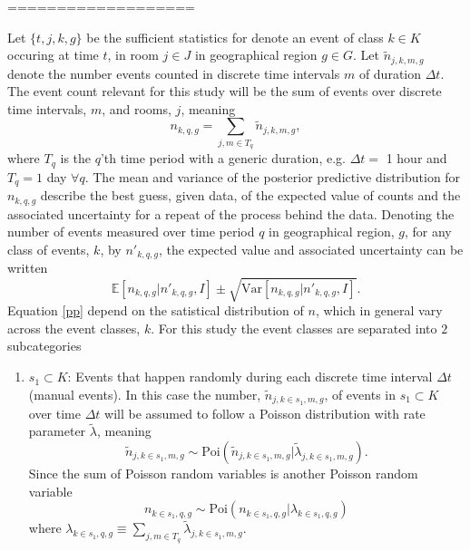 ===================


\begin{example}
	Let $\{t,j,k,g\}$ be the sufficient statistics for denote an event of class $k\in K$ occuring at time $t$, in room $j\in J$ in geographical region $g\in G$. Let $\tilde{n}_{j,k,m,g}$ denote the number events counted in discrete time intervals $m$ of duration $\Delta t$. The event count relevant for this study will be the sum of events over discrete time intervals, $m$, and rooms, $j$, meaning 
	\begin{equation}
		n_{k,q,g} = \sum_{j,m\in T_q}\tilde{n}_{j,k,m,g},
	\end{equation} 
	where $T_q$ is the $q$'th time period with a generic duration, e.g. $\Delta t=$ 1 hour and $T_q=1$ day $\forall q$. The mean and variance of the posterior predictive distribution for $n_{k,q,g}$ describe the best guess, given data, of the expected value of counts and the associated uncertainty for a repeat of the process behind the data. Denoting the number of events measured over time period $q$ in geographical region, $g$, for any class of events, $k$, by $n'_{k,q,g}$, the expected value and associated uncertainty can be written~\citep{Sivia2006,murphy2013}
	\begin{equation}
		\mathbb{E}[n_{k,q,g}|n'_{k,q,g},I]\pm \sqrt{\text{Var}[n_{k,q,g}|n'_{k,q,g},I]}.
		\label{pp}
	\end{equation}	
	Equation \eqref{pp} depend on the satistical distribution of $n$, which in general vary across the event classes, $k$. For this study the event classes are separated into $2$ subcategories
	\begin{enumerate}
		\item $s_1\subset K$: Events that happen randomly during each discrete time interval $\Delta t$ (manual events). In this case the number, $\tilde{n}_{j,k\in s_1,m,g}$, of events in $s_1\subset K$ over time $\Delta t$ will be assumed to follow a Poisson distribution with rate parameter $\tilde{\lambda}$, meaning
		\begin{equation}
			\tilde{n}_{j,k\in s_1,m,g} \sim \text{Poi}(\tilde{n}_{j,k\in s_1,m,g}|\tilde{\lambda}_{j,k\in s_1,m,g}).
		\end{equation}
		Since the sum of Poisson random variables is another Poisson random variable
		\begin{equation}
			n_{k\in s_1,q,g} \sim \text{Poi}(n_{k\in s_1,q,g}|\lambda_{k\in s_1,q,g})
		\end{equation}
		where $\lambda_{k\in s_1,q,g} \equiv \sum_{j,m\in T_q}\tilde{\lambda}_{j,k\in s_1,m,g}$.
		

\end{enumerate}
\end{example}
